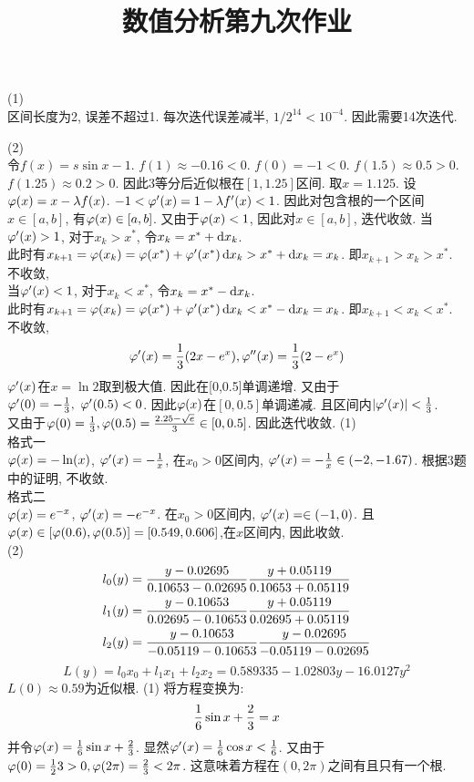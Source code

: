 \documentclass[UTF8,9pt]{ctexart}
\title{数值分析第九次作业}
\begin{document}
 
\maketitle
{}
(1)\\
区间长度为2, 误差不超过1. 每次迭代误差减半, $1/2^{14}<10^{-4}$. 因此需要14次迭代. 

(2)\\
令$f(x)=s\sin x-1$. $f(1)\approx -0.16<0$. $f(0) =-1<0$. $f(1.5)\approx 0.5>0$. $f(1.25)\approx 0.2>0$. 因此3等分后近似根在$[1,1.25]$区间. 取$x=1.125$.
设$\varphi(x) = x-\lambda f(x)$. $-1<\varphi'(x) =1 - \lambda f'(x) <1$. 因此对包含根的一个区间$x\in[a,b]$, 有$\varphi(x)\in [a,b]$. 又由于$\varphi(x)<1$, 因此对$x\in [a,b]$, 迭代收敛. 
当$\varphi'(x)>1$, 对于$x_k>x^*$, 令$x_k=x^*+\mathop{}\!\mathrm{d} x_k $. \\
此时有$x_{k+1}= \varphi(x_k) = \varphi(x^*)+\varphi'(x^*)\mathop{}\!\mathrm{d} x_k>x^*+\mathop{}\!\mathrm{d} x_k=x_k$. 即$x_{k+1}>x_k>x^*$. 不收敛, \\
当$\varphi'(x)<1$, 对于$x_k<x^*$, 令$x_k=x^*-\mathop{}\!\mathrm{d} x_k $. \\
此时有$x_{k+1}= \varphi(x_k) = \varphi(x^*)+\varphi'(x^*)\mathop{}\!\mathrm{d} x_k<x^*-\mathop{}\!\mathrm{d} x_k=x_k$. 即$x_{k+1}<x_k<x^*$. 不收敛, \\
$$\varphi'(x) = \frac{1}{3}(2x-e^x), \varphi''(x)=\frac{1}{3}(2-e^x)$$
$\varphi'(x)$在$x=\ln 2$取到极大值. 因此在[0,0.5]单调递增. 又由于$\varphi'(0) = -\frac{1}{3},\ \varphi'(0.5)<0$. 因此$\varphi(x)$在$[0,0.5]$单调递减. 且区间内$|\varphi'(x)|<\frac{1}{3}$.\\
又由于$\varphi(0) = \frac{1}{3}, \varphi(0.5) = \frac{2.25-\sqrt{e}}{3} \in[0,0.5]$.
因此迭代收敛. 
(1) \\
格式一\\
$\varphi(x) = -\ln(x)$, $\varphi'(x)=-\frac{1}{x}$, 在$x_0>0$区间内, $\varphi'(x)=-\frac{1}{x}\in(-2,-1.67)$. 根据3题中的证明, 不收敛. \\
格式二\\
$\varphi(x) = e^{-x}$, $\varphi'(x) =-e^{-x}$. 在$x_0>0$区间内, $\varphi'(x)=\in(-1,0)$. 且$\varphi(x)\in[\varphi(0.6),\varphi(0.5)] = [0.549,0.606]$,在$x$区间内, 因此收敛. \\

(2) 
$$\begin{aligned} 
        l_0(y) &= \frac{y-0.02695}{0.10653-0.02695}\frac{y+0.05119}{0.10653+0.05119}\\
        l_1(y) &= \frac{y-0.10653}{0.02695-0.10653}\frac{y+0.05119}{0.02695+0.05119}\\
        l_2(y) &= \frac{y-0.10653}{-0.05119-0.10653}\frac{y-0.02695}{-0.05119-0.02695}
 \end{aligned}$$
$$L(y) = l_0x_0+l_1x_1+l_2x_2 = 0.589335 - 1.02803 y - 16.0127 y^2$$
$L(0)\approx0.59$为近似根.
(1)  将方程变换为: $$\frac{1}{6}\sin x+\frac{2}{3} = x$$
并令$\varphi(x) = \frac{1}{6}\sin x+\frac{2}{3}$. 显然$\varphi'(x)=\frac{1}{6}\cos x<\frac{1}{6}$. 又由于$\varphi(0)=\frac{1}{2}{3}>0,\varphi(2\pi)=\frac{2}{3}<2\pi$. 这意味着方程在$(0,2\pi)$之间有且只有一个根. 
\end{document}

